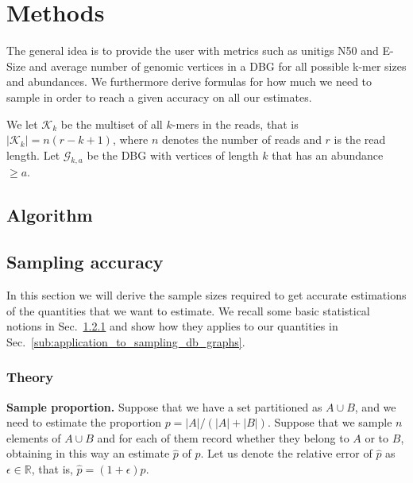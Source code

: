\documentclass[a4paper,11pt]{article}
\newcommand{\kristoffer}[1]{{\color{red}{#1}}}
\begin{document}
\section{Methods} %
\label{sec:methods}

The general idea is to provide the user with metrics such as unitigs N50 and E-Size and average number of genomic vertices in a DBG  for all possible k-mer sizes and abundances. \kristoffer{ We implement a FM-index data structure described in cite XX. This allows us to query a k-mer, its in and out neighbors in O() time. }  We furthermore derive formulas for how much we need to sample in order to reach a given accuracy on all our estimates. 

We let $\mathcal{K}_k$ be the multiset of all $k$-mers in the reads, that is $|\mathcal{K}_k| = n(r-k+1)$, where $n$ denotes the number of reads and $r$ is the read length. Let $\mathcal{G}_{k,a}$ be the DBG with vertices of length $k$ that has an abundance $\geq a$.

\subsection{Algorithm} %
\label{sub:algorithm}


\subsection{Sampling accuracy}

In this section we will derive the sample sizes required to get accurate estimations of the quantities that we want to estimate. We recall some basic statistical notions in Sec.~\ref{ssub:theory} and show how they applies to our quantities in Sec.~\ref{sub:application_to_sampling_db_graphs}. 



\subsubsection{Theory} %
\label{ssub:theory}



\textbf{Sample proportion.} Suppose that we have a set partitioned as $A \cup B$, and we need to estimate the proportion $p = |A| / (|A| + |B|)$. Suppose that we sample $n$ elements of $A \cup B$ and for each of them record whether they belong to $A$ or to $B$, obtaining in this way an estimate $\hat{p}$ of $p$. Let us denote the relative error of $\hat{p}$ as $\epsilon \in \mathbb{R}$, that is, $\hat{p} = (1 + \epsilon)p$.
\end{document}
